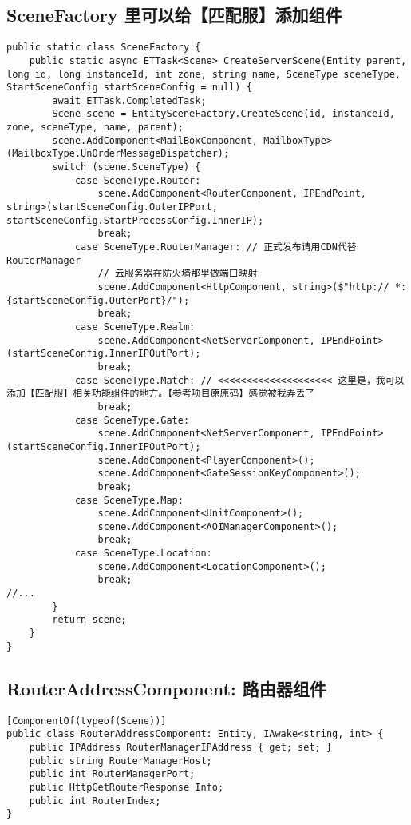 \documentclass[9pt, b5paper]{article}
\begin{document}
\subsection{SceneFactory 里可以给【匹配服】添加组件}
\label{sec-6-3}
\begin{verbatim}
public static class SceneFactory {
    public static async ETTask<Scene> CreateServerScene(Entity parent, long id, long instanceId, int zone, string name, SceneType sceneType, StartSceneConfig startSceneConfig = null) {
        await ETTask.CompletedTask;
        Scene scene = EntitySceneFactory.CreateScene(id, instanceId, zone, sceneType, name, parent);
        scene.AddComponent<MailBoxComponent, MailboxType>(MailboxType.UnOrderMessageDispatcher);
        switch (scene.SceneType) {
            case SceneType.Router:
                scene.AddComponent<RouterComponent, IPEndPoint, string>(startSceneConfig.OuterIPPort, startSceneConfig.StartProcessConfig.InnerIP);
                break;
            case SceneType.RouterManager: // 正式发布请用CDN代替RouterManager
                // 云服务器在防火墙那里做端口映射
                scene.AddComponent<HttpComponent, string>($"http:// *:{startSceneConfig.OuterPort}/");
                break;
            case SceneType.Realm:
                scene.AddComponent<NetServerComponent, IPEndPoint>(startSceneConfig.InnerIPOutPort);
                break;
            case SceneType.Match: // <<<<<<<<<<<<<<<<<<<< 这里是，我可以添加【匹配服】相关功能组件的地方。【参考项目原原码】感觉被我弄丢了
                break;
            case SceneType.Gate:
                scene.AddComponent<NetServerComponent, IPEndPoint>(startSceneConfig.InnerIPOutPort);
                scene.AddComponent<PlayerComponent>();
                scene.AddComponent<GateSessionKeyComponent>();
                break;
            case SceneType.Map:
                scene.AddComponent<UnitComponent>();
                scene.AddComponent<AOIManagerComponent>();
                break;
            case SceneType.Location:
                scene.AddComponent<LocationComponent>();
                break;
//...
        }
        return scene;
    }
}
\end{verbatim}
\subsection{RouterAddressComponent: 路由器组件}
\label{sec-6-4}
\begin{verbatim}
[ComponentOf(typeof(Scene))]
public class RouterAddressComponent: Entity, IAwake<string, int> {
    public IPAddress RouterManagerIPAddress { get; set; }
    public string RouterManagerHost;
    public int RouterManagerPort;
    public HttpGetRouterResponse Info;
    public int RouterIndex;
}
\end{verbatim}
\end{document}
